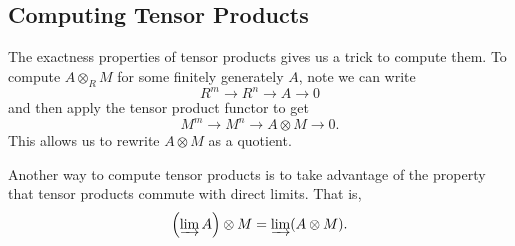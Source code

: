 \subsection{Computing Tensor Products}
The exactness properties of tensor products gives us a trick to compute them. To compute $A \otimes_R M$ for some finitely generately $A$, note we can write
\[
    R^m \to R^n \to A \to 0
\]
and then apply the tensor product functor to get
\[
    M^m \to M^n \to A \otimes M \to 0.
\]
This allows us to rewrite $A \otimes M$ as a quotient.

Another way to compute tensor products is to take advantage of the property that tensor products commute with direct limits. That is,
\[
    \left( \varinjlim A \right) \otimes M = \varinjlim (A \otimes M).
\]



